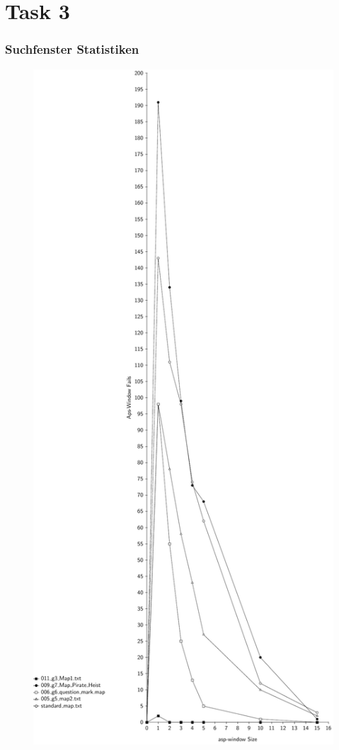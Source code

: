 \documentclass{beamer}
\begin{document}
\section{Task 3}

\begin{frame}
\frametitle{Suchfenster Statistiken}
  \begin{figure}
    \includegraphics[scale=0.18]{figures/aspFails}
  \end{figure}
\end{frame}
\end{document}
